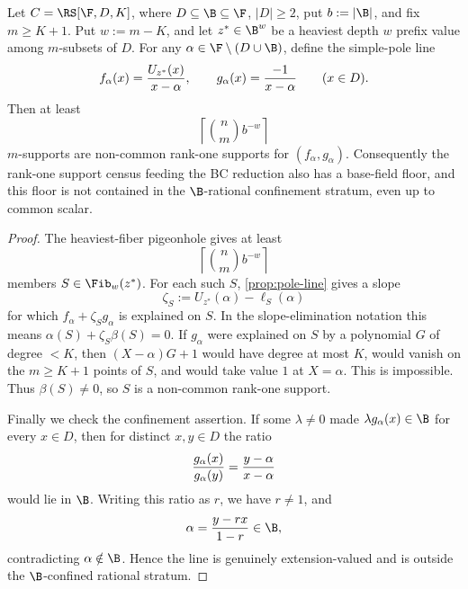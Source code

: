 \begin{corollary}
\label{cor:bc-rank-one-pole-floor}
Let \(C=\RS[\F,D,K]\), where \(D\subseteq\B\subseteq\F\), \(|D|\ge2\), put
\(b:=|\B|\), and fix \(m\ge K+1\).  Put \(w:=m-K\), and let
\(z^*\in\B^w\) be a heaviest depth \(w\) prefix value among \(m\)-subsets of
\(D\).  For any
\(\alpha\in\F\setminus(D\cup\B)\), define the simple-pole line
\[
        f_\alpha(x)={U_{z^*}(x)\over x-\alpha},\qquad
        g_\alpha(x)={-1\over x-\alpha}\qquad(x\in D).
\]
Then at least
\[
        \left\lceil \binom n{m}b^{-w}\right\rceil
\]
\(m\)-supports are non-common rank-one supports for \((f_\alpha,g_\alpha)\).
Consequently the rank-one support census feeding the BC reduction also has a
base-field floor, and this floor is not contained in the \(\B\)-rational
confinement stratum, even up to common scalar.
\end{corollary}

\begin{proof}
The heaviest-fiber pigeonhole gives at least
\[
        \left\lceil \binom n{m}b^{-w}\right\rceil
\]
members \(S\in\Fib_w(z^*)\).  For each such \(S\), \cref{prop:pole-line}
gives a slope
\[
        \zeta_S:=U_{z^*}(\alpha)-\ell_S(\alpha)
\]
for which \(f_\alpha+\zeta_Sg_\alpha\) is explained on \(S\).  In the
slope-elimination notation this means
\(\alpha(S)+\zeta_S\beta(S)=0\).  If \(g_\alpha\) were explained on \(S\) by
a polynomial \(G\) of degree \(<K\), then \((X-\alpha)G+1\) would have degree
at most \(K\), would vanish on the \(m\ge K+1\) points of \(S\), and would
take value \(1\) at \(X=\alpha\).  This is impossible.  Thus
\(\beta(S)\ne0\), so \(S\) is a non-common rank-one support.

Finally we check the confinement assertion.  If some \(\lambda\ne0\) made
\(\lambda g_\alpha(x)\in\B\) for every \(x\in D\), then for distinct
\(x,y\in D\) the ratio
\[
        {g_\alpha(x)\over g_\alpha(y)}={y-\alpha\over x-\alpha}
\]
would lie in \(\B\).  Writing this ratio as \(r\), we have \(r\ne1\), and
\[
        \alpha={y-rx\over 1-r}\in\B,
\]
contradicting \(\alpha\notin\B\).  Hence the line is genuinely
extension-valued and is outside the \(\B\)-confined rational stratum.
\end{proof}

